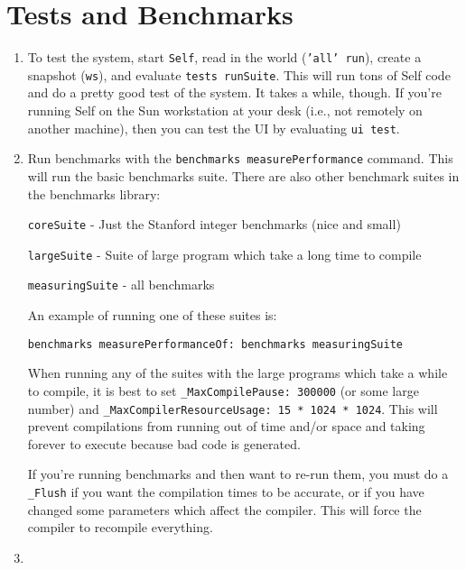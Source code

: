 \section{Tests and Benchmarks}
\begin{enumerate}
\item
To test the system, start {\tt Self}, read in the world ({\tt 'all'
run}), create a snapshot ({\tt ws}), and evaluate {\tt tests
runSuite}.  This will run tons of Self code and do a pretty good test
of the system.  It takes a while, though.  If you're running Self on
the Sun workstation at your desk (i.e., not remotely on another
machine), then you can test the UI by evaluating {\tt ui test}.

\item

Run benchmarks with the {\tt benchmarks measurePerformance} command.
This will run the basic benchmarks suite.  There are also other
benchmark suites in the benchmarks library:

\bq
{\tt coreSuite} - Just the Stanford integer benchmarks (nice and small)

{\tt largeSuite} - Suite of large program which take a long time to compile

{\tt measuringSuite} - all benchmarks
\eq

An example of running one of these suites is:
\begin{small}
\bq
     {\tt benchmarks measurePerformanceOf: benchmarks measuringSuite}
\eq
\end{small}

When running any of the suites with the large programs which take a
while to compile, it is best to set {\tt \_MaxCompilePause: 300000}
(or some large number) and {\tt \_MaxCompilerResourceUsage: 15 * 1024
* 1024}.  This will prevent compilations from running out of time
and/or space and taking forever to execute because bad code is
generated.

If you're running benchmarks and then want to re-run them, you must do
a {\tt \_Flush} if you want the compilation times to be accurate, or if you
have changed some parameters which affect the compiler.  This will
force the compiler to recompile everything.

\item


\end{enumerate}
